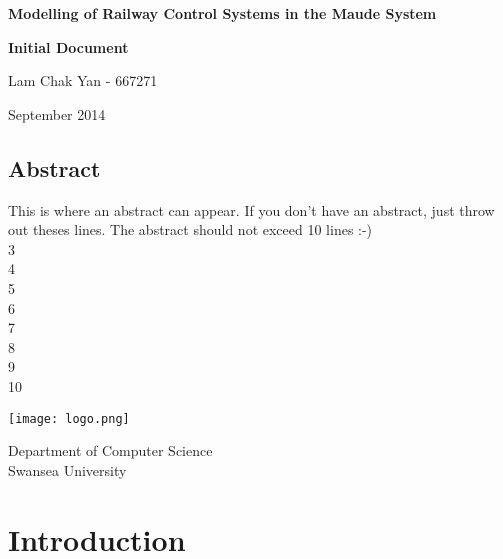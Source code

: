\documentclass{report}
\begin{document}
%
%

\begin{center}
{\huge \bf Modelling of Railway Control Systems in the Maude System}
\end{center}

\begin{center}
\vspace{1cm}
{\Large \bf Initial Document}
\end{center}

\begin{center}
{\small  Lam Chak Yan - 667271}
\end{center}

\begin{center}
September 2014
\end{center}

\vspace{3cm}

\begin{center} 
\section*{Abstract}
\end{center}
This is where an abstract can appear. If you don't have an abstract,
just throw out theses lines. The abstract should not exceed 10 lines
:-)\\
3\\
4\\
5\\
6\\
7\\
8\\
9\\
10
\vspace{2cm}

\begin{center}
\texttt{[image: logo.png]}
\end{center}

\begin{center}
Department of Computer Science\\
Swansea University
\end{center}

\thispagestyle{empty}

\newpage

\thispagestyle{empty}

\newpage
\tableofcontents{}
\newpage
\chapter{Introduction}
\end{document}
